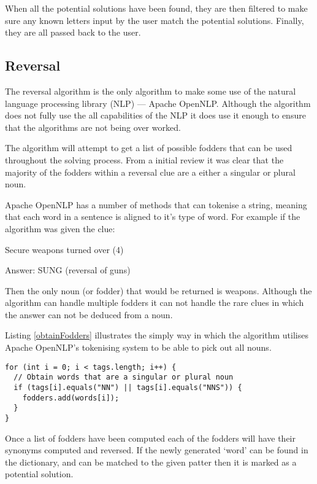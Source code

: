 When all the potential solutions have been found, they are then filtered to
 make sure any known letters input by the user match the potential solutions. 
Finally, they are all passed back to the user.
 

\subsection{Reversal}

The reversal algorithm is the only algorithm to make some use of the natural 
language processing library (NLP) --- Apache OpenNLP. Although the algorithm 
does not fully use the all capabilities of the NLP it does use it enough to 
ensure that the algorithms are not being over worked.

The algorithm will attempt to get a list of possible fodders that can be used 
throughout the solving process. From a initial review it was clear that the 
majority of the fodders within a reversal clue are a either a singular or plural
noun.

Apache OpenNLP has a number of methods that can tokenise a string, meaning that 
each word in a sentence is aligned to it's type of word. For example if the 
algorithm was given the clue:

Secure weapons turned over (4)

Answer: SUNG (reversal of guns)

Then the only noun (or fodder) that would be returned is weapons. Although the 
algorithm can handle multiple fodders it can not handle the rare clues in which
the answer can not be deduced from a noun.

Listing \ref{obtainFodders} illustrates the simply way in which the algorithm 
utilises Apache OpenNLP's tokenising system to be able to pick out all nouns.

\begin{lstlisting}[caption={Deducing all singular or plural nouns within the clue},
                   label=obtainFodders]  
for (int i = 0; i < tags.length; i++) {
  // Obtain words that are a singular or plural noun
  if (tags[i].equals("NN") || tags[i].equals("NNS")) {
    fodders.add(words[i]);
  }
}
\end{lstlisting}

Once a list of fodders have been computed each of the fodders will have their
synonyms computed and reversed. If the newly generated `word' can be found in 
the dictionary, and can be matched to the given patter then it is marked as a 
potential solution.


